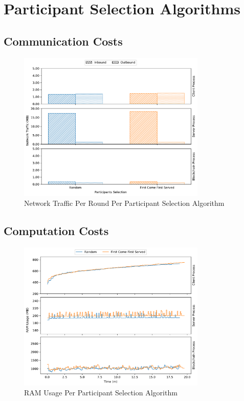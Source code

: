 \section{Participant Selection Algorithms}

\subsection{Communication Costs}

\vfill

\begin{figure}[!h]
    \centering
    \centering
    \includegraphics[width=0.8\textwidth]{graphics/selection/net.pdf}
    \caption{Network Traffic Per Round Per Participant Selection Algorithm}
    \label{fig:net_selection}
\end{figure}

\vfill

\clearpage

\subsection{Computation Costs}

\begin{figure}[!h]
    \centering
    \centering
    \includegraphics[width=0.8\textwidth]{graphics/selection/ram.pdf}
    \caption{RAM Usage Per Participant Selection Algorithm}
    \label{fig:ram_selection}
\end{figure}


